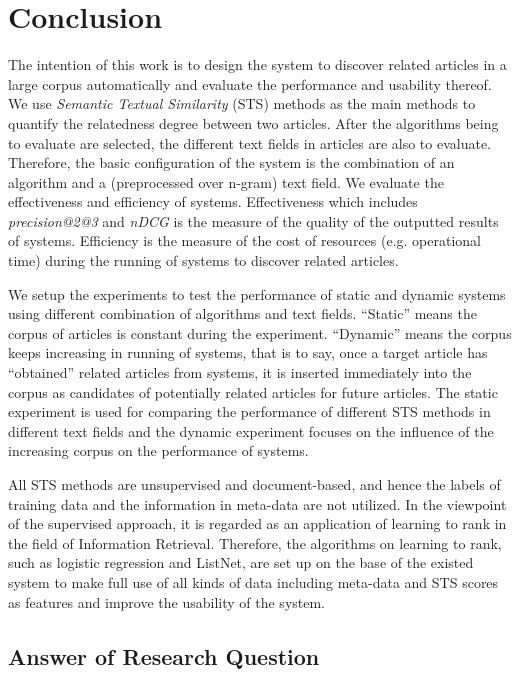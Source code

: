 \section{Conclusion}

The intention of this work is to design the system to discover related articles in a large corpus automatically and evaluate the performance and usability thereof. We use \textit{Semantic Textual Similarity} (STS) methods as the main methods to quantify the relatedness degree between two articles. After the algorithms being to evaluate are selected, the different text fields in articles are also to evaluate. Therefore, the basic configuration of the system is the combination of an algorithm and a (preprocessed over n-gram) text field. We evaluate the effectiveness and efficiency of systems. Effectiveness which includes \textit{precision@2@3} and \textit{nDCG} is the measure of the quality of the outputted results of systems. Efficiency is the measure of the cost of resources (e.g. operational time) during the running of systems to discover related articles. 

We setup the experiments to test the performance of static and dynamic systems using different combination of algorithms and text fields. ``Static'' means the corpus of articles is constant during the experiment. ``Dynamic'' means the corpus keeps increasing in running of systems, that is to say, once a target article has ``obtained'' related articles from systems, it is inserted immediately into the corpus as candidates of potentially related articles for future articles. The static experiment is used for comparing the performance of different STS methods in different text fields and the dynamic experiment focuses on the influence of the increasing corpus on the performance of systems. 

All STS methods are unsupervised and document-based, and hence the labels of training data and the information in meta-data are not utilized. In the viewpoint of the supervised approach, it is regarded as an application of learning to rank in the field of Information Retrieval. Therefore, the algorithms on learning to rank, such as logistic regression and ListNet, are set up on the base of the existed system to make full use of all kinds of data including meta-data and STS scores as features and improve the usability of the system.


\subsection{Answer of Research Question}

